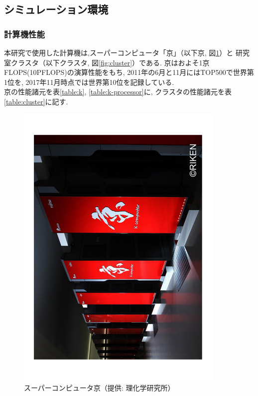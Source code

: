 \subsection{シミュレーション環境}
\subsubsection{計算機性能}
本研究で使用した計算機は,スーパーコンピュータ「京」（以下京, 図\ref{fig:k}）と
研究室クラスタ（以下クラスタ, 図\ref{fig:cluster}）である. 京はおよそ1京FLOPS(10PFLOPS)の演算性能をもち, 2011年の6月と11月にはTOP500\cite{top500}で世界第1位を,
2017年11月時点では世界第10位を記録している.\\
京の性能諸元\cite{riken-system}を表\ref{table:k}, \ref{table:k-processor}に, クラスタの性能諸元\cite{intel-xeon}を表\ref{table:cluster}に記す.\\

\begin{figure}[htb]
  \begin{center}
    \includegraphics[width=10.0cm, angle=-90]{./images/k}
    \caption{スーパーコンピュータ京（提供: 理化学研究所）}
    \label{fig:k}
  \end{center}
\end{figure}~\\


